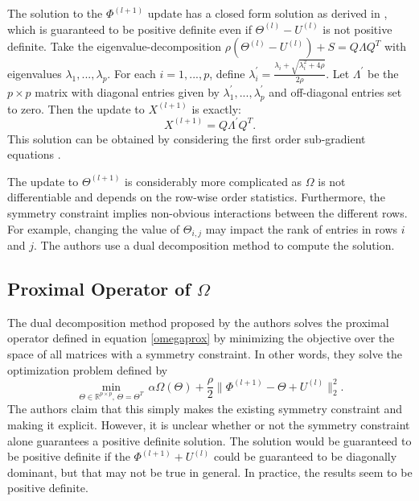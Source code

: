 \documentclass{uwstat572}
\theoremstyle{remark}
\theoremstyle{definition}
\begin{document}
The solution to the $\Phi^{(l+1)}$ update has a closed form solution as derived in \citep{Boyd2011},  which is guaranteed to be positive definite even if $\Theta^{(l)} - U^{(l)}$ is not positive definite.  Take the eigenvalue-decomposition $\rho(\Theta^{(l)} - U^{(l)}) + S =  Q \Lambda Q^T$ with eigenvalues $\lambda_1,...,\lambda_p$.  For each $i = 1,...,p$, define $\lambda^{\prime}_i = \frac{\lambda_i + \sqrt{\lambda_i^2 + 4\rho}}{2 \rho}$.  Let $\Lambda^{\prime}$ be the $p \times p$ matrix with diagonal entries given by $\lambda^{\prime}_1,...,\lambda^{\prime}_p$ and off-diagonal entries set to zero.  Then the update to $X^{(l+1)}$ is exactly:
\begin{equation*}
X^{(l+1)} = Q \Lambda^{\prime} Q^T.
\end{equation*}
This solution can be obtained by considering the first order sub-gradient equations \citep{Boyd2011}.

The update to $\Theta^{(l+1)}$ is considerably more complicated as $\Omega$ is not differentiable and depends on the row-wise order statistics.  Furthermore, the symmetry constraint implies non-obvious interactions between the different rows.  For example, changing the value of $\Theta_{i,j}$ may impact the rank of entries in rows $i$ and $j$. The authors use a dual decomposition method to compute the solution.  


\subsection{Proximal Operator of $\Omega$}

The dual decomposition method proposed by the authors solves the proximal operator defined in equation \eqref{omegaprox} by minimizing the objective over the space of all matrices with a symmetry constraint.  In other words, they solve the optimization problem defined by
\begin{equation}\label{dualdecomp}
\min_{\Theta \in \mathbb{R}^{p \times p}, \, \Theta = \Theta^T} \, \alpha \Omega(\Theta) + \frac{\rho}{2} \| \Phi^{(l+1)} - \Theta + U^{(l)} \|_2^2.
\end{equation}
The authors claim that this simply makes the existing symmetry constraint and making it explicit.  
However, it is unclear whether or not the symmetry constraint alone guarantees a positive definite solution.  The solution would be guaranteed to be positive definite if the $\Phi^{(l+1)} + U^{(l)}$ could be guaranteed to be diagonally dominant, but that may not be true in general.  In practice, the results seem to be positive definite.
\end{document}
